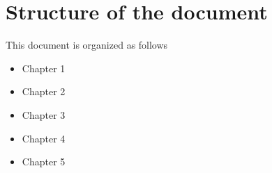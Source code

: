 \section{Structure of the document}
This document is organized as follows
\begin{itemize}
 \item {Chapter 1}
 \item {Chapter 2}
 \item {Chapter 3}
 \item {Chapter 4}
 \item {Chapter 5}

\end{itemize}